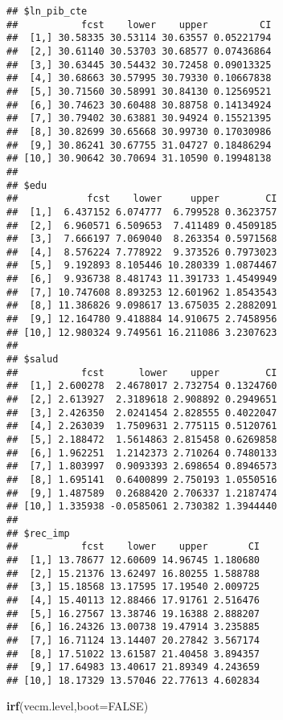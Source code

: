 \documentclass[]{book}
\newenvironment{Shaded}{\begin{snugshade}}{\end{snugshade}}
\newcommand{\KeywordTok}[1]{\textcolor[rgb]{0.13,0.29,0.53}{\textbf{#1}}}
\newcommand{\DataTypeTok}[1]{\textcolor[rgb]{0.13,0.29,0.53}{#1}}
\newcommand{\OtherTok}[1]{\textcolor[rgb]{0.56,0.35,0.01}{#1}}
\newcommand{\NormalTok}[1]{#1}
\theoremstyle{definition}
\theoremstyle{definition}
\theoremstyle{definition}
\theoremstyle{remark}
\begin{document}
\begin{verbatim}
## $ln_pib_cte
##           fcst    lower    upper         CI
##  [1,] 30.58335 30.53114 30.63557 0.05221794
##  [2,] 30.61140 30.53703 30.68577 0.07436864
##  [3,] 30.63445 30.54432 30.72458 0.09013325
##  [4,] 30.68663 30.57995 30.79330 0.10667838
##  [5,] 30.71560 30.58991 30.84130 0.12569521
##  [6,] 30.74623 30.60488 30.88758 0.14134924
##  [7,] 30.79402 30.63881 30.94924 0.15521395
##  [8,] 30.82699 30.65668 30.99730 0.17030986
##  [9,] 30.86241 30.67755 31.04727 0.18486294
## [10,] 30.90642 30.70694 31.10590 0.19948138
## 
## $edu
##            fcst    lower     upper        CI
##  [1,]  6.437152 6.074777  6.799528 0.3623757
##  [2,]  6.960571 6.509653  7.411489 0.4509185
##  [3,]  7.666197 7.069040  8.263354 0.5971568
##  [4,]  8.576224 7.778922  9.373526 0.7973023
##  [5,]  9.192893 8.105446 10.280339 1.0874467
##  [6,]  9.936738 8.481743 11.391733 1.4549949
##  [7,] 10.747608 8.893253 12.601962 1.8543543
##  [8,] 11.386826 9.098617 13.675035 2.2882091
##  [9,] 12.164780 9.418884 14.910675 2.7458956
## [10,] 12.980324 9.749561 16.211086 3.2307623
## 
## $salud
##           fcst      lower    upper        CI
##  [1,] 2.600278  2.4678017 2.732754 0.1324760
##  [2,] 2.613927  2.3189618 2.908892 0.2949651
##  [3,] 2.426350  2.0241454 2.828555 0.4022047
##  [4,] 2.263039  1.7509631 2.775115 0.5120761
##  [5,] 2.188472  1.5614863 2.815458 0.6269858
##  [6,] 1.962251  1.2142373 2.710264 0.7480133
##  [7,] 1.803997  0.9093393 2.698654 0.8946573
##  [8,] 1.695141  0.6400899 2.750193 1.0550516
##  [9,] 1.487589  0.2688420 2.706337 1.2187474
## [10,] 1.335938 -0.0585061 2.730382 1.3944440
## 
## $rec_imp
##           fcst    lower    upper       CI
##  [1,] 13.78677 12.60609 14.96745 1.180680
##  [2,] 15.21376 13.62497 16.80255 1.588788
##  [3,] 15.18568 13.17595 17.19540 2.009725
##  [4,] 15.40113 12.88466 17.91761 2.516476
##  [5,] 16.27567 13.38746 19.16388 2.888207
##  [6,] 16.24326 13.00738 19.47914 3.235885
##  [7,] 16.71124 13.14407 20.27842 3.567174
##  [8,] 17.51022 13.61587 21.40458 3.894357
##  [9,] 17.64983 13.40617 21.89349 4.243659
## [10,] 18.17329 13.57046 22.77613 4.602834
\end{verbatim}

\begin{Shaded}
\begin{Highlighting}[]
\KeywordTok{irf}\NormalTok{(vecm.level,}\DataTypeTok{boot=}\OtherTok{FALSE}\NormalTok{)}
\end{Highlighting}
\end{Shaded}
\end{document}
